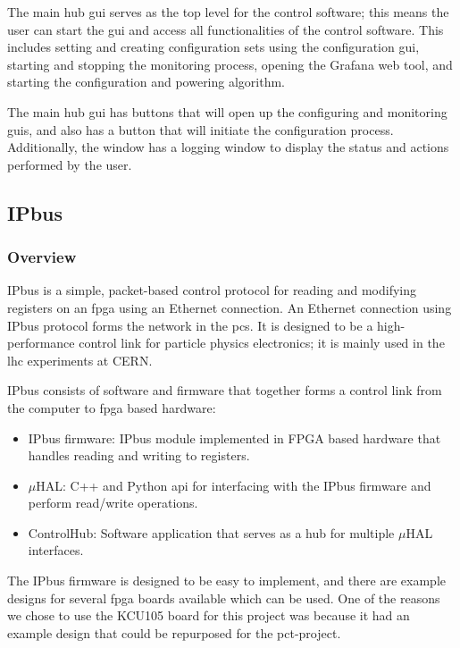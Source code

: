 \documentclass[main.tex]{subfiles}
\begin{document}
The main hub \gls{gui} serves as the top level for the control software; this means the user can start the \gls{gui} and access all functionalities of the control software. This includes setting and creating configuration sets using the configuration \gls{gui}, starting and stopping the monitoring process, opening the Grafana web tool, and starting the configuration and powering algorithm.

The main hub \gls{gui} has buttons that will open up the configuring and monitoring \gls{gui}s, and also has a button that will initiate the configuration process. Additionally, the window has a logging window to display the status and actions performed by the user.

\newpage
\subsection{IPbus}
\label{ssec: IPbus}
 \subsubsection{Overview}
 
 IPbus is a simple, packet-based control protocol for reading and modifying registers on an \gls{fpga} using an Ethernet connection. An Ethernet connection using IPbus protocol forms the network in the \gls{pcs}. It is designed to be a high-performance control link for particle physics electronics; it is mainly used in the \gls{lhc} experiments at CERN.
 
IPbus consists of software and firmware that together forms a control link from the computer to \gls{fpga} based hardware:

\begin{itemize}
    \item IPbus firmware: IPbus module implemented in FPGA based hardware that handles reading and writing to registers.
    \item $\mu$HAL: C++ and Python \gls{api} for interfacing with the IPbus firmware and perform read/write operations.
    \item ControlHub: Software application that serves as a hub for multiple $\mu$HAL interfaces.
\end{itemize}  

The IPbus firmware is designed to be easy to implement, and there are example designs for several \gls{fpga} boards available which can be used. One of the reasons we chose to use the KCU105 board for this project was because it had an example design that could be repurposed for the \gls{pct}-project.
\end{document}
